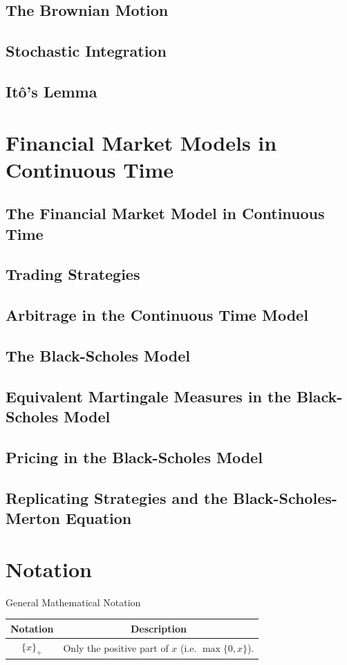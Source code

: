 \documentclass[11pt,a4paper]{article}
\begin{document}
\subsection{The Brownian Motion}

\subsection{Stochastic Integration}

\subsection{It\^o's Lemma}

\section{Financial Market Models in Continuous Time} \label{sec_financial_market_models_in_continuous_time}

\subsection{The Financial Market Model in Continuous Time}

\subsection{Trading Strategies}

\subsection{Arbitrage in the Continuous Time Model}

\subsection{The Black-Scholes Model}

\subsection{Equivalent Martingale Measures in the Black-Scholes Model}

\subsection{Pricing in the Black-Scholes Model}

\subsection{Replicating Strategies and the Black-Scholes-Merton Equation}

\section{Notation}

  \begin{notation}{General Mathematical Notation}
    \begin{tabular}{c|c}
      Notation&Description\\\hline
      $\{x\}_+$&Only the positive part of $x$ (i.e. $\max\{0,x\}$).
    \end{tabular}
  \end{notation}
\end{document}
